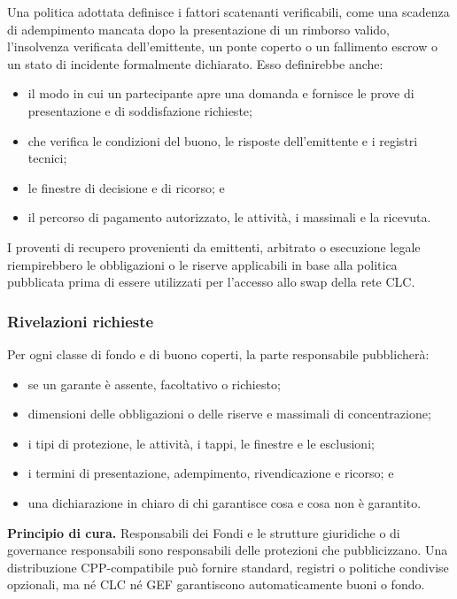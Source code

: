 \documentclass[11pt]{article}
\begin{document}
Una politica adottata definisce i fattori scatenanti verificabili, come una scadenza di adempimento mancata dopo la presentazione di un rimborso valido, l'insolvenza verificata dell'emittente, un ponte coperto o un fallimento escrow o un stato di incidente formalmente dichiarato. Esso definirebbe anche:

\begin{itemize}[leftmargin=*]
\item il modo in cui un partecipante apre una domanda e fornisce le prove di presentazione e di soddisfazione richieste;
\item che verifica le condizioni del buono, le risposte dell'emittente e i registri tecnici;
\item le finestre di decisione e di ricorso; e
\item il percorso di pagamento autorizzato, le attività, i massimali e la ricevuta.
\end{itemize}
I proventi di recupero provenienti da emittenti, arbitrato o esecuzione legale riempirebbero le obbligazioni o le riserve applicabili in base alla politica pubblicata prima di essere utilizzati per l'accesso allo swap della rete CLC.

\subsubsection*{Rivelazioni richieste}

Per ogni classe di fondo e di buono coperti, la parte responsabile pubblicherà:

\begin{itemize}[leftmargin=*]
\item se un garante è assente, facoltativo o richiesto;
\item dimensioni delle obbligazioni o delle riserve e massimali di concentrazione;
\item i tipi di protezione, le attività, i tappi, le finestre e le esclusioni;
\item i termini di presentazione, adempimento, rivendicazione e ricorso; e
\item una dichiarazione in chiaro di chi garantisce cosa e cosa non è garantito.
\end{itemize}
\textbf{Principio di cura.} Responsabili dei Fondi e le strutture giuridiche o di governance responsabili sono responsabili delle protezioni che pubblicizzano. Una distribuzione CPP-compatibile può fornire standard, registri o politiche condivise opzionali, ma né CLC né GEF garantiscono automaticamente buoni o fondo.
\end{document}
